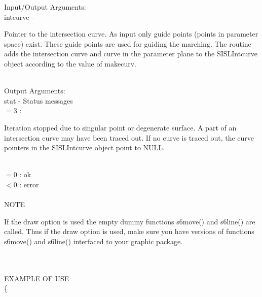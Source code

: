         \>Input/Output Arguments:\\
        \>\>    {\fov intcurve}\> - \>  \begin{minipg2}
                                Pointer to the intersection curve.
                                As input only
                                guide points (points in parameter space)
                                exist. These guide points
                                are used for guiding the marching.
                                The routine adds the
                                intersection curve and curve in the parameter
                                plane to the SISLIntcurve object according to the value
                                of makecurv.
                                \end{minipg2}\\[0.8ex]
        \>Output Arguments:\\
        \>\>    {\fov stat}     \> - \> Status messages\\
                \>\>\>\>\>      $= 3$ : \>      \begin{minipg5}
                                                Iteration stopped due to singular
                                                point or degenerate surface. A part of
                                                an intersection curve may have been
                                                traced out. If no curve is traced out,
                                                the curve pointers in the SISLIntcurve
                                                object point to NULL.
                                                \end{minipg5} \\[0.3ex]
                \>\>\>\>\>      $= 0$   :\> ok\\
                \>\>\>\>\>      $< 0$   :\> error\\
\\
NOTE\\
\>      \begin{minipg6}
If the draw option is used the empty dummy functions s6move() and
s6line() are called.
Thus if the draw option is used, make sure
you have versions of functions s6move() and s6line() interfaced to your graphic package.
\end{minipg6}\\
\\ %
EXAMPLE OF USE\\
                \>      \{ \\
